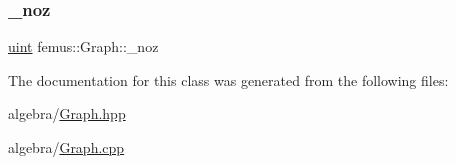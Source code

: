 \subsubsection{\texorpdfstring{\+\_\+noz}{\_noz}}
{\footnotesize\ttfamily \mbox{\hyperlink{_typedefs_8hpp_a91ad9478d81a7aaf2593e8d9c3d06a14}{uint}} femus\+::\+Graph\+::\+\_\+noz}



The documentation for this class was generated from the following files\+:\begin{DoxyCompactItemize}
\item 
algebra/\mbox{\hyperlink{_graph_8hpp}{Graph.\+hpp}}\item 
algebra/\mbox{\hyperlink{_graph_8cpp}{Graph.\+cpp}}\end{DoxyCompactItemize}
